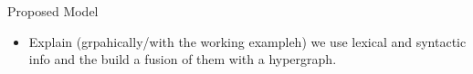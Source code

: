 \documentclass[10pt,xcolor=table]{beamer}
\begin{document}
%	
%	 
%
%


\begin{frame}{Proposed Model}
\begin{itemize}
\item Explain (grpahically/with the working exampleh) we use lexical and syntactic info and the build a fusion of them with a hypergraph.
\end{itemize}

\end{frame}
\end{document}
